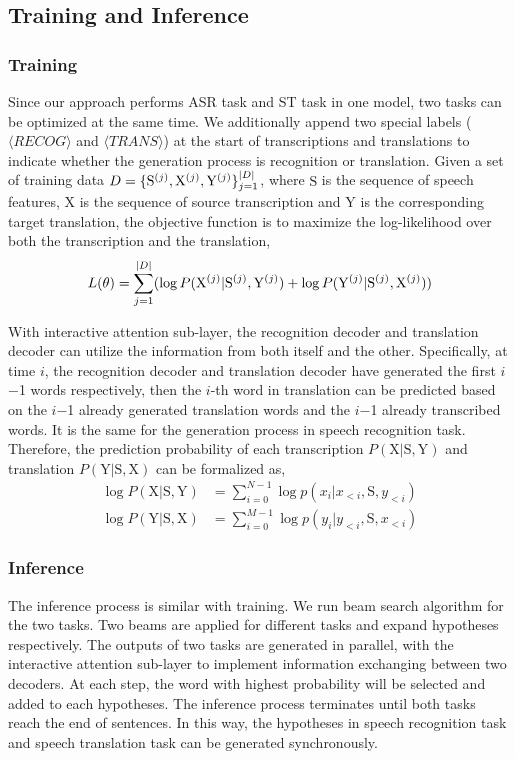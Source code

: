 \documentclass[letterpaper]{article} %
\begin{document}
\subsection{Training and Inference}
\subsubsection{Training}
Since our approach performs ASR task and ST task in one model, two tasks can be optimized at the same time. We additionally append two special labels ($\langle  RECOG\rangle$ and $\langle TRANS\rangle$) at the start of transcriptions and translations to indicate whether the generation process is recognition or translation.  Given a set of training data $\small{D=\{\mathrm{S}^{(j)},\mathrm{X}^{(j)},\mathrm{Y}^{(j)}\}_{j=1}^{|D|}}$, where $\mathrm{S}$ is the sequence of speech features, $\mathrm{X}$ is the sequence of source transcription and $\mathrm{Y}$ is the corresponding target translation, the objective function is to maximize the log-likelihood over both the transcription and the translation,
\begin{equation}
\small
L(\theta)=\sum_{j=1}^{|D|} (\log P(\mathrm{X}^{(j)}|\mathrm{S}^{(j)},\mathrm{Y}^{(j)}) + \log P(\mathrm{Y}^{(j)}|\mathrm{S}^{(j)},\mathrm{X}^{(j)}))
\end{equation}

With interactive attention sub-layer, the recognition decoder and translation decoder can utilize the information from both itself and the other. Specifically, at time $i$, the recognition decoder and translation decoder have generated the first $i$$-$1 words respectively, then the $i$-th word in translation can be predicted based on the $i$$-$1 already generated translation words and the $i$$-$1 already transcribed words. It is the same for the generation process in speech recognition task. Therefore, the prediction probability of each transcription $ P(\mathrm{X}|\mathrm{S},\mathrm{Y})$ and translation $ P(\mathrm{Y}|\mathrm{S},\mathrm{X})$ can be formalized as,
\begin{align}
\log P(\mathrm{X}|\mathrm{S},\mathrm{Y}) &= \sum_{i=0}^{N-1} \log p(x_{i}|x_{<i},\mathrm{S},y_{<i}) \\
\log P(\mathrm{Y}|\mathrm{S},\mathrm{X}) &= \sum_{i=0}^{M-1} \log p(y_{i}|y_{<i},\mathrm{S},x_{<i})
\end{align} 

\subsubsection{Inference}
The inference process is similar with training. We run beam search algorithm for the two tasks. Two beams are applied for different tasks and expand hypotheses respectively. The outputs of two tasks are generated in parallel, with the interactive attention sub-layer to implement information exchanging between two decoders. At each step, the word with highest probability will be selected and added to each hypotheses. The inference process terminates until both tasks reach the end of sentences.  In this way, the hypotheses in speech recognition task and speech translation task can be generated synchronously. 
\end{document}
